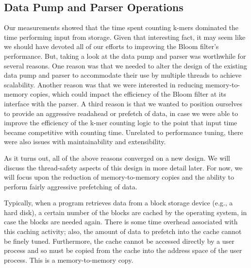 \subsection{Data Pump and Parser Operations}

Our measurements showed that the time spent counting k-mers dominated the time
performing input from storage. Given that interesting fact, it may seem like we
should have devoted all of our efforts to improving the Bloom filter's
performance. But, taking a look at the data pump and parser was worthwhile for
several reasons. One reason was that we needed to alter the design of the
existing data pump and parser to accommodate their use by multiple threads to
achieve scalability. Another reason was that we were interested in reducing
memory-to-memory copies, which could impact the efficiency of the Bloom filter
at its interface with the parser. A third reason is that we wanted to position
ourselves to provide an aggressive readahead or prefetch of data, in case we
were able to improve the efficiency of the k-mer counting logic to the point
that input time became competitive with counting time. Unrelated to performance
tuning, there were also issues with maintainability and extensibility.

As it turns out, all of the above reasons converged on a new design. We will
discuss the thread-safety aspects of this design in more detail later. For now,
we will focus upon the reduction of memory-to-memory copies and the ability to
perform fairly aggressive prefetching of data.

Typically, when a program retrieves data from a block storage device (e.g., a
hard disk), a certain number of the blocks are cached by the operating system,
in case the blocks are needed again. There is some time overhead associated
with this caching activity; also, the amount of data to prefetch into the cache
cannot be finely tuned. Furthermore, the cache cannot be accessed directly by a
user process and so must be copied from the cache into the address space of the
user process.  This is a memory-to-memory copy. 

